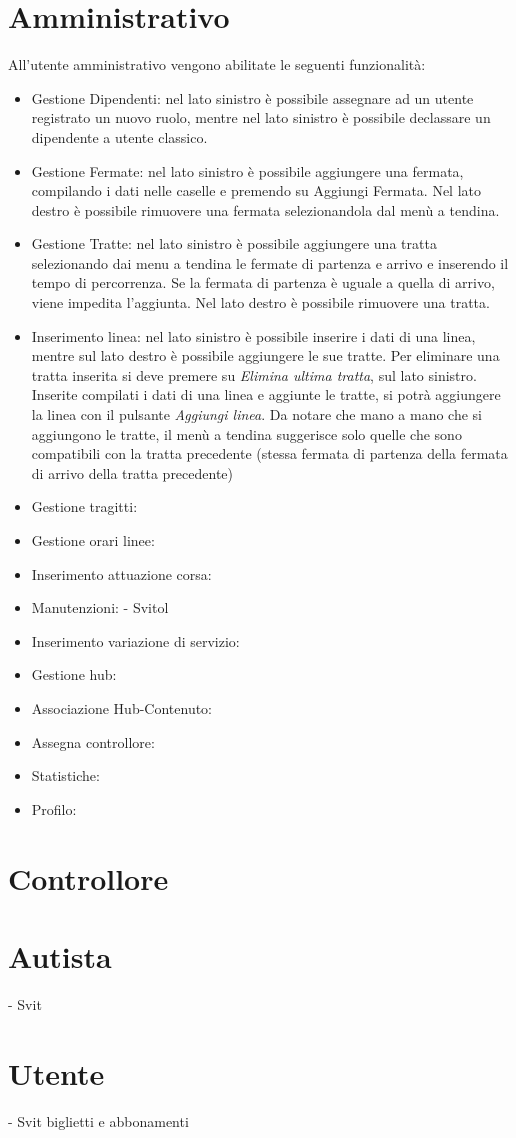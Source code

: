 \documentclass[12pt,a4paper]{report}
\begin{document}
\section{Amministrativo}
All'utente amministrativo vengono abilitate le seguenti funzionalità:
\begin{itemize}
    \item Gestione Dipendenti: nel lato sinistro è possibile assegnare ad un utente registrato un nuovo ruolo, mentre nel lato sinistro è possibile declassare un dipendente a utente classico.
    \item Gestione Fermate: nel lato sinistro è possibile aggiungere una fermata, compilando i dati nelle caselle e premendo su Aggiungi Fermata. Nel lato destro è possibile rimuovere una fermata selezionandola dal menù a tendina.
    \item Gestione Tratte: nel lato sinistro è possibile aggiungere una tratta selezionando dai menu a tendina le fermate di partenza e arrivo e inserendo il tempo di percorrenza. Se la fermata di partenza è uguale a quella di arrivo, viene impedita l'aggiunta. Nel lato destro è possibile rimuovere una tratta.
    \item Inserimento linea: nel lato sinistro è possibile inserire i dati di una linea, mentre sul lato destro è possibile aggiungere le sue tratte. Per eliminare una tratta inserita si deve premere su \textit{Elimina ultima tratta}, sul lato sinistro. Inserite compilati i dati di una linea e aggiunte le tratte, si potrà aggiungere la linea con il pulsante \textit{Aggiungi linea}. Da notare che mano a mano che si aggiungono le tratte, il menù a tendina suggerisce solo quelle che sono compatibili con la tratta precedente (stessa fermata di partenza della fermata di arrivo della tratta precedente)
    \item Gestione tragitti:
    \item Gestione orari linee:
    \item Inserimento attuazione corsa:
    \item Manutenzioni: - Svitol
    \item Inserimento variazione di servizio:
    \item Gestione hub:
    \item Associazione Hub-Contenuto:
    \item Assegna controllore:
    \item Statistiche:
    \item Profilo:
\end{itemize}
\section{Controllore}
\section{Autista}
- Svit
\section{Utente}
- Svit biglietti e abbonamenti
\end{document}
